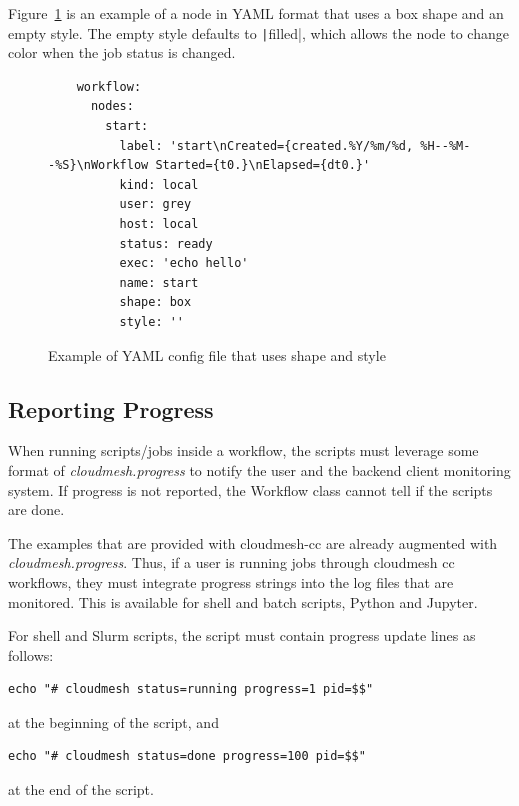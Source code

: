 Figure~\ref{fig:shape-style-yaml} is an example of a node in YAML
format that uses a box shape and an empty style. The empty style
defaults to \texttt|filled|, which allows the node to change
color when the job status is changed.

\begin{figure}
    \begin{verbatim}
    workflow:
      nodes:
        start:
          label: 'start\nCreated={created.%Y/%m/%d, %H--%M--%S}\nWorkflow Started={t0.}\nElapsed={dt0.}'
          kind: local
          user: grey
          host: local
          status: ready
          exec: 'echo hello'
          name: start
          shape: box
          style: ''
    \end{verbatim}
    \caption{Example of YAML config file that uses shape and style}
    \label{fig:shape-style-yaml}
\end{figure}



\subsection{Reporting Progress}\label{reporting-progress}

When running scripts/jobs inside a workflow, the scripts must leverage
some format of {\em cloudmesh.progress} to notify the user and the
backend client monitoring system. If progress is not reported, the
Workflow class cannot tell if the scripts are done.

The examples that are provided with cloudmesh-cc are already augmented
with {\em cloudmesh.progress}. Thus, if a user is running jobs through
cloudmesh cc workflows, they must integrate progress strings into the
log files that are monitored. This is available for shell and batch
scripts, Python and Jupyter.

For shell and Slurm scripts, the script must contain progress update
lines as follows:

\begin{verbatim}
echo "# cloudmesh status=running progress=1 pid=$$"
\end{verbatim}

at the beginning of the script, and

\begin{verbatim}
echo "# cloudmesh status=done progress=100 pid=$$"
\end{verbatim}

at the end of the script.

